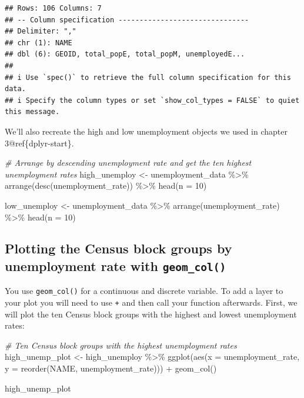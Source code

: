 \documentclass[
  krantz2]{krantz}
\makeatletter
\newenvironment{Shaded}{\begin{snugshade}}{\end{snugshade}}
\newcommand{\AttributeTok}[1]{\textcolor[rgb]{0.61,0.61,0.61}{#1}}
\newcommand{\CommentTok}[1]{\textcolor[rgb]{0.37,0.37,0.37}{\textit{#1}}}
\newcommand{\DecValTok}[1]{\textcolor[rgb]{0.06,0.06,0.06}{#1}}
\newcommand{\FunctionTok}[1]{\textcolor[rgb]{0,0,0}{#1}}
\newcommand{\NormalTok}[1]{#1}
\newcommand{\OtherTok}[1]{\textcolor[rgb]{0.37,0.37,0.37}{#1}}
\newcommand{\SpecialCharTok}[1]{\textcolor[rgb]{0,0,0}{#1}}
\newenvironment{kframe}{%
\medskip{}
\setlength{\fboxsep}{.8em}
 \def\at@end@of@kframe{}%
 \ifinner\ifhmode%
  \def\at@end@of@kframe{\end{minipage}}%
  \begin{minipage}{\columnwidth}%
 \fi\fi%
 \def\FrameCommand##1{\hskip\@totalleftmargin \hskip-\fboxsep
 \colorbox{shadecolor}{##1}\hskip-\fboxsep
     \hskip-\linewidth \hskip-\@totalleftmargin \hskip\columnwidth}%
 \MakeFramed {\advance\hsize-\width
   \@totalleftmargin\z@ \linewidth\hsize
   \@setminipage}}%
 {\par\unskip\endMakeFramed%
 \at@end@of@kframe}
\renewenvironment{Shaded}{\begin{kframe}}{\end{kframe}}
\makeatother
\begin{document}
\begin{verbatim}
## Rows: 106 Columns: 7
## -- Column specification -------------------------------
## Delimiter: ","
## chr (1): NAME
## dbl (6): GEOID, total_popE, total_popM, unemployedE...
##
## i Use `spec()` to retrieve the full column specification for this data.
## i Specify the column types or set `show_col_types = FALSE` to quiet this message.
\end{verbatim}

We'll also recreate the high and low unemployment objects we used in chapter 3@ref\{dplyr-start\}.

\begin{Shaded}
\begin{Highlighting}[]
\CommentTok{\# Arrange by descending unemployment rate and get the ten highest unemployment rates}
\NormalTok{high\_unemploy }\OtherTok{\textless{}{-}}\NormalTok{ unemployment\_data }\SpecialCharTok{\%\textgreater{}\%}
  \FunctionTok{arrange}\NormalTok{(}\FunctionTok{desc}\NormalTok{(unemployment\_rate)) }\SpecialCharTok{\%\textgreater{}\%}
  \FunctionTok{head}\NormalTok{(}\AttributeTok{n =} \DecValTok{10}\NormalTok{)}

\NormalTok{low\_unemploy }\OtherTok{\textless{}{-}}\NormalTok{ unemployment\_data }\SpecialCharTok{\%\textgreater{}\%}
  \FunctionTok{arrange}\NormalTok{(unemployment\_rate) }\SpecialCharTok{\%\textgreater{}\%}
  \FunctionTok{head}\NormalTok{(}\AttributeTok{n =} \DecValTok{10}\NormalTok{)}
\end{Highlighting}
\end{Shaded}

\hypertarget{plotting-the-census-block-groups-by-unemployment-rate-with-geom_col}{%
\subsection{\texorpdfstring{Plotting the Census block groups by unemployment rate with \texttt{geom\_col()}}{Plotting the Census block groups by unemployment rate with geom\_col()}}\label{plotting-the-census-block-groups-by-unemployment-rate-with-geom_col}}

You use \texttt{geom\_col()} for a continuous and discrete variable. To add a layer to your plot you will need to use \texttt{+} and then call your function afterwards. First, we will plot the ten Census block groups with the highest and lowest unemployment rates:

\begin{Shaded}
\begin{Highlighting}[]
\CommentTok{\# Ten Census block groups with the highest unemployment rates}
\NormalTok{high\_unemp\_plot }\OtherTok{\textless{}{-}}\NormalTok{ high\_unemploy }\SpecialCharTok{\%\textgreater{}\%}
  \FunctionTok{ggplot}\NormalTok{(}\FunctionTok{aes}\NormalTok{(}\AttributeTok{x =}\NormalTok{ unemployment\_rate, }\AttributeTok{y =} \FunctionTok{reorder}\NormalTok{(NAME, unemployment\_rate))) }\SpecialCharTok{+} \FunctionTok{geom\_col}\NormalTok{()}

\NormalTok{high\_unemp\_plot}
\end{Highlighting}
\end{Shaded}
\end{document}
